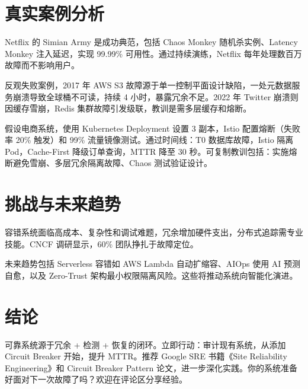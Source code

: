 \chapter{真实案例分析}
Netflix 的 Simian Army 是成功典范，包括 Chaos Monkey 随机杀实例、Latency Monkey 注入延迟，实现 99.99\%{} 可用性。通过持续演练，Netflix 每年处理数百万故障而不影响用户。\par
反观失败案例，2017 年 AWS S3 故障源于单一控制平面设计缺陷，一处元数据服务崩溃导致全球桶不可读，持续 4 小时，暴露冗余不足。2022 年 Twitter 崩溃则因缓存雪崩，Redis 集群故障引发级联，教训是需多层缓存和熔断。\par
假设电商系统，使用 Kubernetes Deployment 设置 3 副本，Istio 配置熔断（失败率 20\%{} 触发）和 99\%{} 流量镜像测试。通过时间线：T0 数据库故障，Istio 隔离 Pod，Cache-First 降级订单查询，MTTR 降至 30 秒。可复制教训包括：实施熔断避免雪崩、多层冗余隔离故障、Chaos 测试验证设计。\par
\chapter{挑战与未来趋势}
容错系统面临高成本、复杂性和调试难题，冗余增加硬件支出，分布式追踪需专业技能。CNCF 调研显示，60\%{} 团队挣扎于故障定位。\par
未来趋势包括 Serverless 容错如 AWS Lambda 自动扩缩容、AIOps 使用 AI 预测自愈，以及 Zero-Trust 架构最小权限隔离风险。这些将推动系统向智能化演进。\par
\chapter{结论}
可靠系统源于冗余 + 检测 + 恢复的闭环。立即行动：审计现有系统，从添加 Circuit Breaker 开始，提升 MTTR。推荐 Google SRE 书籍《Site Reliability Engineering》和 Circuit Breaker Pattern 论文，进一步深化实践。你的系统准备好面对下一次故障了吗？欢迎在评论区分享经验。\par
